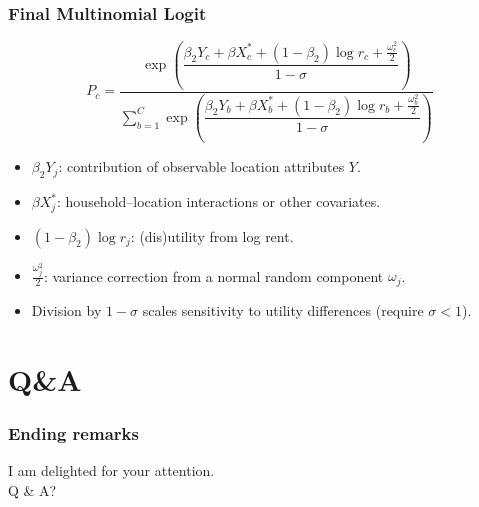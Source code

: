 \documentclass{beamer} %
\theoremstyle{definition}
\begin{document}
	\begin{frame}
		\frametitle{Final Multinomial Logit}
	
		\[
		P_{c}
		= \frac{\exp\!\left(\dfrac{\beta_2 Y_{c} + \beta X_{c}^{*} + (1-\beta_2)\log r_{c} + \tfrac{\omega_{c}^{2}}{2}}{1-\sigma}\right)}
		{\displaystyle\sum_{b=1}^{C}\exp\!\left(\dfrac{\beta_2 Y_{b} + \beta X_{b}^{*} + (1-\beta_2)\log r_{b} + \tfrac{\omega_{b}^{2}}{2}}{1-\sigma}\right)}
		\]
		\begin{itemize}
			\footnotesize
				\item $\beta_{2}Y_{j}$: contribution of observable location attributes $Y$.
				\item $\beta X_{j}^{*}$: household–location interactions or other covariates.
				\item $(1-\beta_{2})\log r_{j}$: (dis)utility from log rent.
				\item $\tfrac{\omega_{j}^{2}}{2}$: variance correction from a normal random component $\omega_{j}$.
				\item Division by $1-\sigma$ scales sensitivity to utility differences (require $\sigma<1$).
		\end{itemize}
	\end{frame}


	\section{Q\&A}
	\begin{frame}[fragile]
		\frametitle{Ending remarks}
		\begin{center}
			I am delighted for your attention.\\
			\vspace{1em}
			Q \& A?
		\end{center}
	\end{frame}
	
\end{document}
